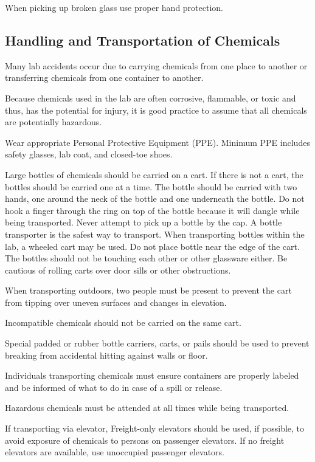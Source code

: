 \documentclass[12pt]{../SOP2}
\begin{document}
\NP When picking up broken glass use proper hand protection.

\subsection{Handling and Transportation of Chemicals}

\NP Many lab accidents occur due to carrying chemicals from one place to another or transferring chemicals from one container to another. 

\NP Because chemicals used in the lab are often corrosive, flammable, or toxic and thus, has the potential for injury, it is good practice to assume that all chemicals are potentially hazardous. 

\NP Wear appropriate Personal Protective Equipment (PPE). Minimum PPE includes safety glasses, lab coat, and closed-toe shoes.

\NP Large bottles of chemicals should be carried on a cart. If there is not a cart, the bottles should be carried one at a time. The bottle should be carried with two hands, one around the neck of the bottle and one underneath the bottle. Do not hook a finger through the ring on top of the bottle because it will dangle while being transported. Never attempt to pick up a bottle by the cap. A bottle transporter is the safest way to transport. 
When transporting bottles within the lab, a wheeled cart may be used. Do not place bottle near the edge of the cart. The bottles should not be touching each other or other glassware either. Be cautious of rolling carts over door sills or other obstructions.

\NP When transporting outdoors, two people must be present to prevent the cart from tipping over uneven surfaces and changes in elevation.

\NP Incompatible chemicals should not be carried on the same cart. 

\NP Special padded or rubber bottle carriers, carts, or pails should be used to prevent breaking from accidental hitting against walls or floor. 

\NP Individuals transporting chemicals must ensure containers are properly labeled and be informed of what to do in case of a spill or release. 

\NP Hazardous chemicals must be attended at all times while being transported.

If transporting via elevator, Freight-only elevators should be used, if possible, to avoid exposure of chemicals to persons on passenger elevators. If no freight elevators are available, use unoccupied passenger elevators.  
\end{document}
